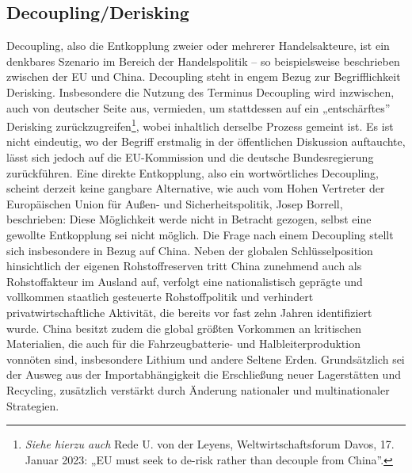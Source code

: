 \documentclass[12pt,a4paper,oneside]{book} %
\begin{document}
	\subsection{Decoupling/Derisking}
	Decoupling, also die Entkopplung zweier oder mehrerer Handelsakteure, ist ein denkbares Szenario im Bereich der Handelspolitik – so beispielsweise beschrieben zwischen der EU und China.\autocite{fuest_geopolitische_2022} Decoupling steht in engem Bezug zur Begrifflichkeit Derisking. Insbesondere die Nutzung des Terminus Decoupling wird inzwischen, auch von deutscher Seite aus, vermieden, um stattdessen auf ein „entschärftes” Derisking zurückzugreifen\footnote{\textit{Siehe hierzu auch} Rede U. von der Leyens, Weltwirtschaftsforum Davos, 17. Januar 2023: „EU must seek to de-risk rather than decouple from China”.}, wobei inhaltlich derselbe Prozess gemeint ist. Es ist nicht eindeutig, wo der Begriff erstmalig in der öffentlichen Diskussion auftauchte, lässt sich jedoch auf die EU-Kommission und die deutsche Bundesregierung zurückführen.\autocite{kormbaki_wettstreit_2023} Eine direkte Entkopplung, also ein wortwörtliches Decoupling, scheint derzeit keine gangbare Alternative, wie auch vom Hohen Vertreter der Europäischen Union für Außen- und Sicherheitspolitik, Josep Borrell, beschrieben: Diese Möglichkeit werde nicht in Betracht gezogen, selbst eine gewollte Entkopplung sei nicht möglich.\autocite{europaischer_auswartiger_dienst_foreign_2023} Die Frage nach einem Decoupling stellt sich insbesondere in Bezug auf China. Neben der globalen Schlüsselposition hinsichtlich der eigenen Rohstoffreserven tritt China zunehmend auch als Rohstoffakteur im Ausland auf, verfolgt eine nationalistisch geprägte und vollkommen staatlich gesteuerte Rohstoffpolitik und verhindert privatwirtschaftliche Aktivität, die bereits vor fast zehn Jahren identifiziert wurde.\autocite{sausmikat_chinas_2015} China besitzt zudem die global größten Vorkommen an kritischen Materialien, die auch für die Fahrzeugbatterie- und Halbleiterproduktion vonnöten sind, insbesondere Lithium und andere Seltene Erden. Grundsätzlich sei der Ausweg aus der Importabhängigkeit die Erschließung neuer Lagerstätten und Recycling, zusätzlich verstärkt durch Änderung nationaler und multinationaler Strategien.\autocite{wissenschaftliche_dienste_des_deutschen_bundestages_seltene_2022}

	
\end{document}
